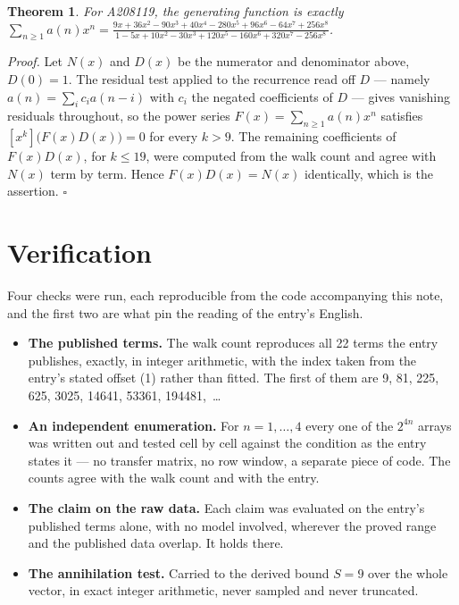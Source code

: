 \documentclass[11pt]{article}
\newtheorem{theorem}{Theorem}
\theoremstyle{definition}
\begin{document}
\begin{theorem} For A208119, the generating function is exactly $\sum_{n\ge 1} a(n)x^n = \frac{9x + 36x^{2} - 90x^{3} + 40x^{4} - 280x^{5} + 96x^{6} - 64x^{7} + 256x^{8}}{1 - 5x + 10x^{2} - 30x^{3} + 120x^{5} - 160x^{6} + 320x^{7} - 256x^{8}}$.\end{theorem}

{\itshape Proof.} Let $N(x)$ and $D(x)$ be the numerator and denominator above, $D(0)=1$. The residual test applied to the recurrence read off $D$ --- namely $a(n) = \sum_i c_i a(n-i)$ with $c_i$ the negated coefficients of $D$ --- gives vanishing residuals throughout, so the power series $F(x)=\sum_{n\ge 1}a(n)x^n$ satisfies $[x^k]\bigl(F(x)D(x)\bigr) = 0$ for every $k > 9$. The remaining coefficients of $F(x)D(x)$, for $k \le 19$, were computed from the walk count and agree with $N(x)$ term by term. Hence $F(x)D(x) = N(x)$ identically, which is the assertion. $\square$

\section{Verification}

Four checks were run, each reproducible from the code accompanying this note, and the first two are what pin the reading of the entry's English.

\begin{itemize}

\item {\bfseries The published terms.} The walk count reproduces all 22 terms the entry publishes, exactly, in integer arithmetic, with the index taken from the entry's stated offset (1) rather than fitted. The first of them are 9, 81, 225, 625, 3025, 14641, 53361, 194481,~\dots

\item {\bfseries An independent enumeration.} For $n = 1,\dots,4$ every one of the $2^{4n}$ arrays was written out and tested cell by cell against the condition as the entry states it --- no transfer matrix, no row window, a separate piece of code. The counts agree with the walk count and with the entry.

\item {\bfseries The claim on the raw data.} Each claim was evaluated on the entry's published terms alone, with no model involved, wherever the proved range and the published data overlap. It holds there.

\item {\bfseries The annihilation test.} Carried to the derived bound $S = 9$ over the whole vector, in exact integer arithmetic, never sampled and never truncated.

\end{itemize}
\end{document}

